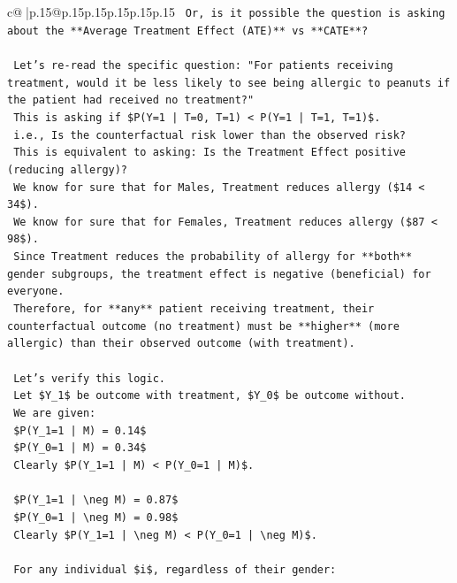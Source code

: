 \documentclass{article}
\begin{document}
{\begin{supertabular}{c@{$\;$}|p{.15\linewidth}@{}p{.15\linewidth}p{.15\linewidth}p{.15\linewidth}p{.15\linewidth}p{.15\linewidth}}
{{{\texttt{    Or, is it possible the question is asking about the **Average Treatment Effect (ATE)** vs **CATE**?} \\
\\ 
\texttt{    Let's re{-}read the specific question: "For patients receiving treatment, would it be less likely to see being allergic to peanuts if the patient had received no treatment?"} \\
\texttt{    This is asking if \$P(Y=1 | T=0, T=1) < P(Y=1 | T=1, T=1)\$.} \\
\texttt{    i.e., Is the counterfactual risk lower than the observed risk?} \\
\texttt{    This is equivalent to asking: Is the Treatment Effect positive (reducing allergy)?} \\
\texttt{    We know for sure that for Males, Treatment reduces allergy (\$14 < 34\$).} \\
\texttt{    We know for sure that for Females, Treatment reduces allergy (\$87 < 98\$).} \\
\texttt{    Since Treatment reduces the probability of allergy for **both** gender subgroups, the treatment effect is negative (beneficial) for everyone.} \\
\texttt{    Therefore, for **any** patient receiving treatment, their counterfactual outcome (no treatment) must be **higher** (more allergic) than their observed outcome (with treatment).} \\
\\ 
\texttt{    Let's verify this logic.} \\
\texttt{    Let \$Y\_1\$ be outcome with treatment, \$Y\_0\$ be outcome without.} \\
\texttt{    We are given:} \\
\texttt{    \$P(Y\_1=1 | M) = 0.14\$} \\
\texttt{    \$P(Y\_0=1 | M) = 0.34\$} \\
\texttt{    Clearly \$P(Y\_1=1 | M) < P(Y\_0=1 | M)\$.} \\
\\ 
\texttt{    \$P(Y\_1=1 | \textbackslash{}neg M) = 0.87\$} \\
\texttt{    \$P(Y\_0=1 | \textbackslash{}neg M) = 0.98\$} \\
\texttt{    Clearly \$P(Y\_1=1 | \textbackslash{}neg M) < P(Y\_0=1 | \textbackslash{}neg M)\$.} \\
\\ 
\texttt{    For any individual \$i\$, regardless of their gender:} \\
}}}
\end{supertabular}}
\end{document}
